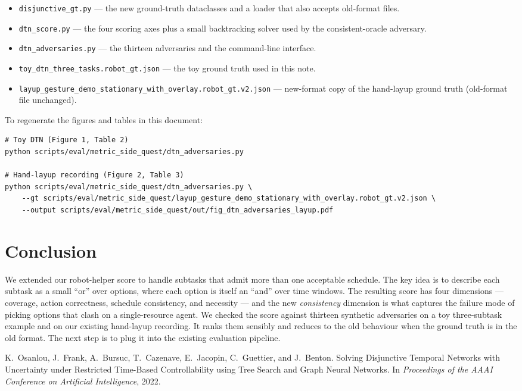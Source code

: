 \documentclass[11pt]{article}
\begin{document}
\begin{itemize}
  \item \texttt{disjunctive\_gt.py} --- the new ground-truth dataclasses
    and a loader that also accepts old-format files.
  \item \texttt{dtn\_score.py} --- the four scoring axes plus a small
    backtracking solver used by the consistent-oracle adversary.
  \item \texttt{dtn\_adversaries.py} --- the thirteen adversaries and
    the command-line interface.
  \item \texttt{toy\_dtn\_three\_tasks.robot\_gt.json} --- the toy
    ground truth used in this note.
  \item \texttt{layup\_gesture\_demo\_stationary\_with\_overlay.robot\_gt.v2.json}
    --- new-format copy of the hand-layup ground truth (old-format
    file unchanged).
\end{itemize}

\noindent
To regenerate the figures and tables in this document:
\begin{lstlisting}
# Toy DTN (Figure 1, Table 2)
python scripts/eval/metric_side_quest/dtn_adversaries.py

# Hand-layup recording (Figure 2, Table 3)
python scripts/eval/metric_side_quest/dtn_adversaries.py \
    --gt scripts/eval/metric_side_quest/layup_gesture_demo_stationary_with_overlay.robot_gt.v2.json \
    --output scripts/eval/metric_side_quest/out/fig_dtn_adversaries_layup.pdf
\end{lstlisting}

\section{Conclusion}

We extended our robot-helper score to handle subtasks that admit more
than one acceptable schedule. The key idea is to describe each
subtask as a small ``or'' over options, where each option is itself
an ``and'' over time windows. The resulting score has four dimensions
--- coverage, action correctness, schedule consistency, and
necessity --- and the new \emph{consistency} dimension is what
captures the failure mode of picking options that clash on a
single-resource agent. We checked the score against thirteen
synthetic adversaries on a toy three-subtask example and on our
existing hand-layup recording. It ranks them sensibly and reduces to
the old behaviour when the ground truth is in the old format. The
next step is to plug it into the existing evaluation pipeline.

\begin{thebibliography}{1}

K.~Osanlou, J.~Frank, A.~Bursuc, T.~Cazenave, E.~Jacopin, C.~Guettier,
and J.~Benton.
\newblock Solving Disjunctive Temporal Networks with Uncertainty under
Restricted Time-Based Controllability using Tree Search and Graph
Neural Networks.
\newblock In \emph{Proceedings of the AAAI Conference on Artificial
Intelligence}, 2022.

\end{thebibliography}
\end{document}
